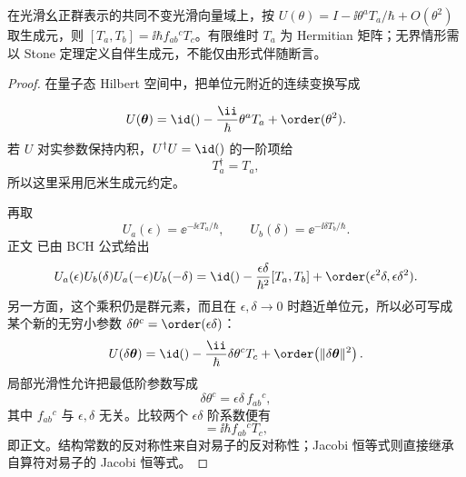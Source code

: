 \begin{proposition}
在光滑幺正群表示的共同不变光滑向量域上，按 $U(\theta)=I-\ii\theta^aT_a/\hbar+O(\theta^2)$ 取生成元，则 $[T_a,T_b]=\ii\hbar f_{ab}{}^cT_c$。有限维时 $T_a$ 为 Hermitian 矩阵；无界情形需以 Stone 定理定义自伴生成元，不能仅由形式伴随断言。
\end{proposition}
\begin{proof}
在量子态 Hilbert 空间中，把单位元附近的连续变换写成

\begin{equation*}
 U(\boldsymbol\theta)
 =\id()-\frac{\ii}{\hbar}\theta^aT_a+
 \order(\theta^2).
\end{equation*}
若 $U$ 对实参数保持内积，$U^\dagger U=\id()$ 的一阶项给
\begin{equation*}
 T_a^\dagger=T_a,
\end{equation*}
所以这里采用厄米生成元约定。

再取
\begin{equation*}
 U_a(\epsilon)=\ee^{-\ii\epsilon T_a/\hbar},
 \qquad
 U_b(\delta)=\ee^{-\ii\delta T_b/\hbar}.
\end{equation*}
正文 已由 BCH 公式给出
\begin{equation*}
 U_a(\epsilon)U_b(\delta)U_a(-\epsilon)U_b(-\delta)
 =\id()-\frac{\epsilon\delta}{\hbar^2}[T_a,T_b]+
 \order(\epsilon^2\delta,\epsilon\delta^2).
\end{equation*}
另一方面，这个乘积仍是群元素，而且在 $\epsilon,\delta\to0$ 时趋近单位元，所以必可写成某个新的无穷小参数 $\delta\theta^c=\order(\epsilon\delta)$：
\begin{equation*}
 U(\delta\boldsymbol\theta)
 =\id()-\frac{\ii}{\hbar}\delta\theta^cT_c+
 \order\!\left(\|\delta\boldsymbol\theta\|^2\right).
\end{equation*}
局部光滑性允许把最低阶参数写成
\begin{equation*}
 \delta\theta^c=\epsilon\delta\,f_{ab}{}^c,
\end{equation*}
其中 $f_{ab}{}^c$ 与 $\epsilon,\delta$ 无关。比较两个 $\epsilon\delta$ 阶系数便有
\begin{equation*}
 [T_a,T_b]=\ii\hbar f_{ab}{}^cT_c,
\end{equation*}
即正文。结构常数的反对称性来自对易子的反对称性；Jacobi 恒等式则直接继承自算符对易子的 Jacobi 恒等式。
\end{proof}
